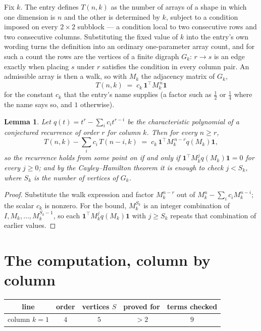 \documentclass[11pt,a4paper]{article}
\theoremstyle{plain}
\newtheorem{lemma}[theorem]{Lemma}
\theoremstyle{definition}
\begin{document}
Fix $k$. The entry defines $T(n,k)$ as the number of arrays of a shape in which one dimension
is $n$ and the other is determined by $k$, subject to a condition imposed on every
$2\times2$ subblock --- a condition local to two consecutive rows and two consecutive columns.
Substituting the fixed value of $k$ into the entry's own wording turns the definition into an
ordinary one-parameter array count, and for such a count the rows are the vertices of a finite
digraph $G_k$: $r\to s$ is an edge exactly when placing $s$ under $r$ satisfies the condition
in every column pair. An admissible array is then a walk, so with $M_k$ the adjacency matrix
of $G_k$,
\[
T(n,k)\;=\;c_k\,\mathbf{1}^{\!\top}M_k^{\,n}\mathbf{1}
\]
for the constant $c_k$ that the entry's name supplies (a factor such as $\tfrac12$ or
$\tfrac14$ where the name says so, and $1$ otherwise).

\begin{lemma}\label{lem:crit}
Let $q(t)=t^{r}-\sum_i c_it^{r-i}$ be the characteristic polynomial of a conjectured
recurrence of order $r$ for column $k$. Then for every $n\ge r$,
\[
T(n,k)-\sum_i c_i\,T(n-i,k)\;=\;c_k\,\mathbf{1}^{\!\top}M_k^{\,n-r}q(M_k)\mathbf{1},
\]
so the recurrence holds from some point on if and only if
$\mathbf{1}^{\!\top}M_k^{j}q(M_k)\mathbf{1}=0$ for every $j\ge0$; and by the
Cayley--Hamilton theorem it is enough to check $j<S_k$, where $S_k$ is the number of vertices
of $G_k$.
\end{lemma}

\begin{proof}
Substitute the walk expression and factor $M_k^{n-r}$ out of $M_k^{n}-\sum_ic_iM_k^{n-i}$;
the scalar $c_k$ is nonzero. For the bound, $M_k^{S_k}$ is an integer combination of
$I,M_k,\dots,M_k^{S_k-1}$, so each $\mathbf{1}^{\!\top}M_k^{j}q(M_k)\mathbf{1}$ with
$j\ge S_k$ repeats that combination of earlier values.
\end{proof}

\section{The computation, column by column}

\begin{center}
\begin{tabular}{ccccc}
line & order & vertices $S$ & proved for & terms checked \\ \hline
column $k$$=1$ & $4$ & $5$ & $>2$ & $9$ \\
\end{tabular}
\end{center}
\end{document}
